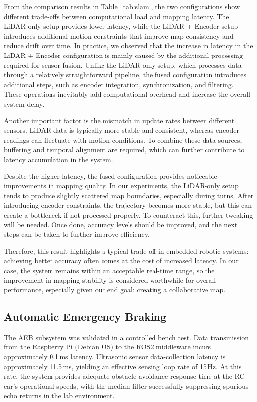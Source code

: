 \documentclass[journal,transmag]{IEEEtran}
\begin{document}
From the comparison results in Table~\ref{tab:slam}, the two configurations show different trade-offs between computational load and mapping latency. The LiDAR-only setup provides lower latency, while the LiDAR + Encoder setup introduces additional motion constraints that improve map consistency and reduce drift over time.
In practice, we observed that the increase in latency in the LiDAR + Encoder configuration is mainly caused by the additional processing required for sensor fusion. Unlike the LiDAR-only setup, which processes data through a relatively straightforward pipeline, the fused configuration introduces additional steps, such as encoder integration, synchronization, and filtering. These operations inevitably add computational overhead and increase the overall system delay.

Another important factor is the mismatch in update rates between different sensors. LiDAR data is typically more stable and consistent, whereas encoder readings can fluctuate with motion conditions. To combine these data sources, buffering and temporal alignment are required, which can further contribute to latency accumulation in the system.

Despite the higher latency, the fused configuration provides noticeable improvements in mapping quality. In our experiments, the LiDAR-only setup tends to produce slightly scattered map boundaries, especially during turns. After introducing encoder constraints, the trajectory becomes more stable, but this can create a bottleneck if not processed properly. To counteract this, further tweaking will be needed. Once done, accuracy levels should be improved, and the next steps can be taken to further improve efficiency.

Therefore, this result highlights a typical trade-off in embedded robotic systems: achieving better accuracy often comes at the cost of increased latency. In our case, the system remains within an acceptable real-time range, so the improvement in mapping stability is considered worthwhile for overall performance, especially given our end goal: creating a collaborative map.

\subsection{Automatic Emergency Braking} The AEB subsystem was validated in a controlled bench test. Data transmission from the Raspberry Pi (Debian OS) to the ROS2 middleware incurs approximately 0.1\,ms latency. Ultrasonic sensor data-collection latency is approximately 11.5\,ms, yielding an effective sensing loop rate of 15\,Hz. At this rate, the system provides adequate obstacle-avoidance response time at the RC car's operational speeds, with the median filter successfully suppressing spurious echo returns in the lab environment.
\end{document}
